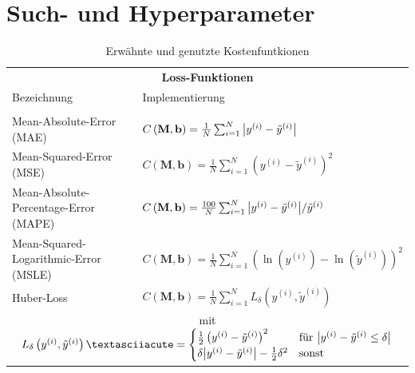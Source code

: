 \section{Such- und Hyperparameter}
\begin{table}[hb!]
	\centering
	\begin{tabular}{ll}
		\multicolumn{2}{c}{\textbf{Loss-Funktionen}}\\[10pt]
		Bezeichnung & Implementierung \\
		\hline\\[-10pt]
		Mean-Absolute-Error (MAE) &$C\left(\mathbf{M}, \mathbf{b}\right) = \frac{1}{N} \sum_{i=1}^{N} \abs{y^{(i)} - \tilde{y}^{(i)}}$\\[10pt]
		Mean-Squared-Error (MSE) & $C\left(\mathbf{M}, \mathbf{b}\right) = \frac{1}{N} \sum_{i=1}^{N} \left(y^{(i)} - \tilde{y}^{(i)}\right)^2$\\[10pt]
		Mean-Absolute-Percentage-Error (MAPE) & $C\left(\mathbf{M}, \mathbf{b}\right) = \frac{100}{N} \sum_{i=1}^{N} {\abs{y^{(i)} - \tilde{y}^{(i)}}  }/{\tilde{y}^{(i)}}$\\[10pt]
		Mean-Squared-Logarithmic-Error (MSLE) &$C\left(\mathbf{M}, \mathbf{b}\right) = \frac{1}{N} \sum_{i=1}^{N} \left(\ln(y^{(i)}) - \ln(\tilde{y}^{(i)})\right)^2$ \\[10pt]
		Huber-Loss & $C\left(\mathbf{M}, \mathbf{b}\right) = \frac{1}{N} \sum_{i=1}^{N} L_{\delta}\left(y^{(i)}, \tilde{y}^{(i)}\right)$\\[10pt]
		\multicolumn{2}{c}{\hspace{1cm} mit \hspace{1cm} $L_{\delta}\left(y^{(i)}, \tilde{y}^{(i)}\right)´=\begin{cases}
			\frac{1}{2}\left(y^{(i)} -  \tilde{y}^{(i)}\right)^2 \quad &\text{für}~\abs{y^{(i)} -  \tilde{y}^{(i)} \leq \delta} \\
			\delta \abs{y^{(i)} -  \tilde{y}^{(i)}} - \frac{1}{2}\delta^2 &\text{sonst}
			\end{cases}$} \\
	\end{tabular}
	\caption{Erwähnte und genutzte Kostenfuntkionen}
	\label{Loss-Funktionen-Tabelle}
\end{table}

